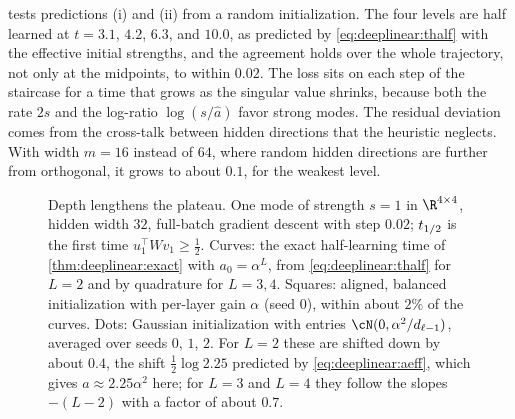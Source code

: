 \begin{refsection}
 tests predictions (i) and (ii) from a random initialization. The four levels are half learned at $t=3.1$, $4.2$, $6.3$, and $10.0$, as predicted by \eqref{eq:deeplinear:thalf} with the effective initial strengths, and the agreement holds over the whole trajectory, not only at the midpoints, to within $0.02$. The loss sits on each step of the staircase for a time that grows as the singular value shrinks, because both the rate $2s$ and the log-ratio $\log(s/\hat a)$ favor strong modes. The residual deviation comes from the cross-talk between hidden directions that the heuristic neglects. With width $m=16$ instead of $64$, where random hidden directions are further from orthogonal, it grows to about $0.1$, for the weakest level.

\begin{figure}[t]
\centering
{}
\caption{Depth lengthens the plateau. One mode of strength $s=1$ in $\R^{4\times4}$, hidden width $32$, full-batch gradient descent with step $0.02$; $t_{1/2}$ is the first time $u_1^\top Wv_1\ge\frac12$. Curves: the exact half-learning time of \cref{thm:deeplinear:exact} with $a_0=\alpha^L$, from \eqref{eq:deeplinear:thalf} for $L=2$ and by quadrature for $L=3,4$. Squares: aligned, balanced initialization with per-layer gain $\alpha$ (seed $0$), within about $2\%$ of the curves. Dots: Gaussian initialization with entries $\cN(0,\alpha^2/d_{\ell-1})$, averaged over seeds $0$, $1$, $2$. For $L=2$ these are shifted down by about $0.4$, the shift $\frac12\log2.25$ predicted by \eqref{eq:deeplinear:aeff}, which gives $\hat a\approx2.25\alpha^2$ here; for $L=3$ and $L=4$ they follow the slopes $-(L-2)$ with a factor of about $0.7$.}\label{fig:deeplinear:depth}
\end{figure}


\end{refsection}
